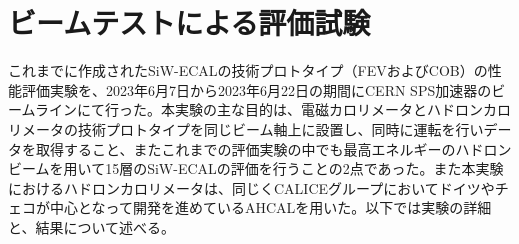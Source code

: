 
\chapter{ビームテストによる評価試験} \label{sec:Beamtest}
これまでに作成されたSiW-ECALの技術プロトタイプ（FEVおよびCOB）の性能評価実験を、2023年6月7日から2023年6月22日の期間にCERN SPS加速器のビームラインにて行った。本実験の主な目的は、電磁カロリメータとハドロンカロリメータの技術プロトタイプを同じビーム軸上に設置し、同時に運転を行いデータを取得すること、またこれまでの評価実験の中でも最高エネルギーのハドロンビームを用いて15層のSiW-ECALの評価を行うことの2点であった。また本実験におけるハドロンカロリメータは、同じくCALICEグループにおいてドイツやチェコが中心となって開発を進めているAHCALを用いた。以下では実験の詳細と、結果について述べる。
